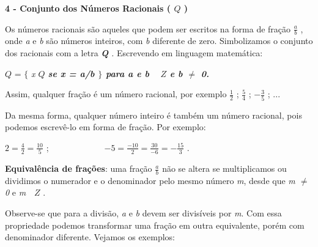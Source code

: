 \documentclass[12pt]{article}
\renewcommand{\_}{\kern-1.5pt\textunderscore\kern-1.5pt}
\begin{document}
\vspace{\baselineskip}
\begin{justify}
\textbf{4 - Conjunto dos Números Racionais ( \( Q \) )}
\end{justify}\par

\begin{justify}
Os números racionais são aqueles que podem ser escritos na forma de fração  \( \frac{a}{b} \) , onde \textit{a} e \textit{b} são números inteiros, com \textit{b} diferente de zero. Simbolizamos o conjunto dos racionais com a letra \textbf{\textit{Q}}\textit{ .} Escrevendo em linguagem matemática:
\end{justify}\par

 \( Q \)  = $ \{ $ \textit{ x   \( Q \) \textbf{  se x = a/b $ \} $  para a e b  \( ~Z \)  e b $ \neq $  0.}}\par

\begin{justify}
Assim, qualquer fração é um número racional, por exemplo  \( \frac{1}{2} \)  ;  \( \frac{5}{4} \)  ; \( -\frac{3}{5} \) ; ...
\end{justify}\par

\begin{justify}
Da mesma forma, qualquer número inteiro é também um número racional, pois podemos escrevê-lo em forma de fração. Por exemplo:
\end{justify}\par

\begin{justify}
 \( 2=\frac{4}{2}=\frac{10}{5} \) ;\ \ \ \ \ \ \ \ \ \ \ \ \   \( -5=\frac{-10}{2}=\frac{30}{-6}=-\frac{15}{3} \) .
\end{justify}\par

\textbf{Equivalência de frações}: uma fração  \( \frac{a}{b} \)   não se altera se multiplicamos ou dividimos o numerador e o denominador pelo mesmo número \textit{m}, desde que\textit{ m $ \neq $  0 }e\textit{ m   \( Z \) }.\par

 \tab {}\par

\begin{justify}
Observe-se que para a divisão, \textit{a} e \textit{b} devem ser divisíveis por \textit{m}. Com essa propriedade podemos transformar uma fração em outra equivalente, porém com denominador diferente. Vejamos os exemplos:
\end{justify}\par
\end{document}
